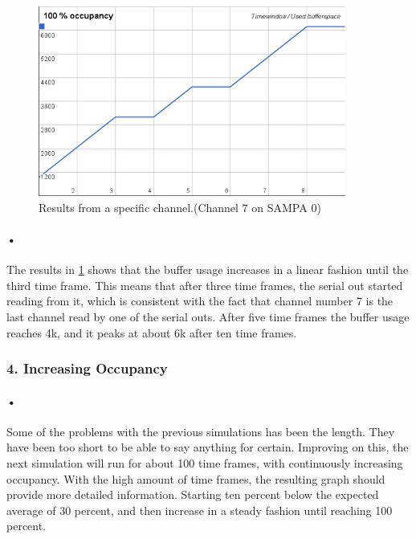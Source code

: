 \documentclass[a4paper, 12pt]{report}
\begin{document}
\begin{figure}[h!]
	\centering
		\includegraphics[width=0.9\textwidth]{images/flat-100.png}
		\caption{Results from a specific channel.(Channel 7 on SAMPA 0)}
		\label{fig:flat-100}
\end{figure}

\paragraph{•} %
The results in \ref{fig:flat-100} shows that the buffer usage increases in a linear fashion until the third time frame.
This means that after three time frames, the serial out started reading from it, which is consistent with the fact that channel number 7 is the last channel read by one of the serial outs.
After five time frames the buffer usage reaches 4k, and it peaks at about 6k after ten time frames.

\subsubsection{4. Increasing Occupancy}

\paragraph{•} %
Some of the problems with the previous simulations has been the length.
They have been too short to be able to say anything for certain.
Improving on this, the next simulation will run for about 100 time frames, with continuously increasing occupancy.
With the high amount of time frames, the resulting graph should provide more detailed information.
Starting ten percent below the expected average of 30 percent, and then increase in a steady fashion until reaching 100 percent.
\end{document}
